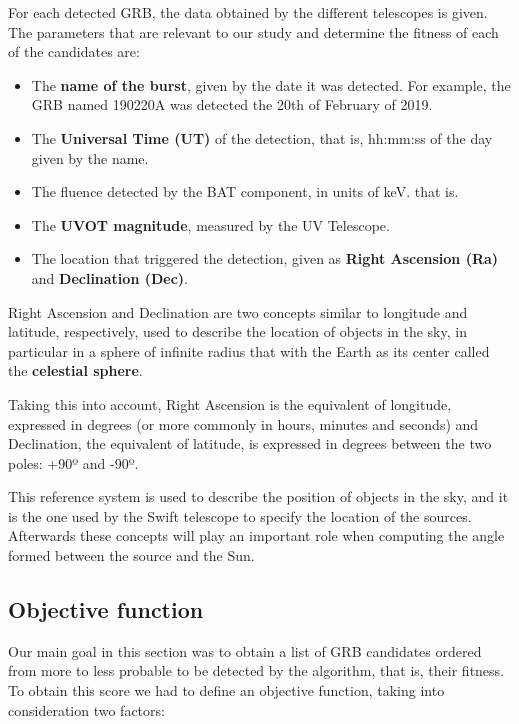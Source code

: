 \documentclass[12pt]{article}
\begin{document}
For each detected GRB, the data obtained by the different telescopes is given. The parameters that are relevant to our study and determine the fitness of each of the candidates are:

\begin{itemize}
\item The \textbf{name of the burst}, given by the date it was detected. For example, the GRB named 190220A was detected the 20th of February of 2019.
\item The \textbf{Universal Time (UT)} of the detection, that is, hh:mm:ss of the day given by the name.
\item The fluence detected by the BAT component, in units of keV. that is.
\item The \textbf{UVOT magnitude}, measured by the UV Telescope.
\item The location that triggered the detection, given as  \textbf{Right Ascension (Ra)} and \textbf{Declination (Dec)}.
\end{itemize}

Right Ascension and Declination are two concepts similar to longitude and latitude, respectively, used to describe the location of objects in the sky, in particular in a sphere of infinite radius that with the Earth as its center called the \textbf{celestial sphere}.

Taking this into account, Right Ascension is the equivalent of longitude, expressed in degrees (or more commonly in hours, minutes and seconds) and Declination, the equivalent of latitude, is expressed in degrees between the two poles: +90º and -90º. \cite{nasareferencesystem}

This reference system is used to describe the position of objects in the sky, and it is the one used by the Swift telescope to specify the location of the sources. Afterwards these concepts will play an important role when computing the angle formed between the source and the Sun.

\subsection{Objective function}

Our main goal in this section was to obtain a list of GRB candidates ordered from more to less probable to be detected by the algorithm, that is, their fitness. To obtain this score we had to define an objective function, taking into consideration two factors:
\end{document}
